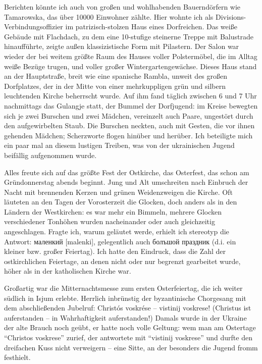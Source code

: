 \documentclass[a5paper,pagesize,10pt,twoside=true]{scrbook}
\newcommand\textcyr[1]{{\fontencoding{OT2}\fontfamily{wncyr}\selectfont #1}}	%
\renewcommand{\marginpar}[2][]{}
\begin{document}
Berichten könnte ich auch von großen und wohlhabenden Bauerndörfern wie Tamarowska, das über \num{10000} Einwohner zählte. Hier wohnte ich als Divisions-Verbindungsoffizier im patrizisch-stolzen Haus eines Dorfreichen. Das weiße Gebäude mit Flachdach, zu dem eine 10-stufige steinerne Treppe mit Balustrade hinaufführte, zeigte außen klassizistische Form mit Pilastern. Der Salon war wieder der bei weitem größte Raum des Hauses voller Polstermöbel, die im Alltag weiße Bezüge trugen, und voller großer Wintergartengewächse. Dieses Haus stand an der Hauptstraße, breit wie eine spanische Rambla, unweit des großen Dorfplatzes, der in der Mitte von einer mehrkuppligen grün und silbern leuchtenden Kirche beherrscht wurde. Auf ihm fand täglich zwischen 6 und 7 Uhr nachmittags das Gulangje statt, der Bummel der Dorfjugend: im Kreise bewegten sich je zwei Burschen und zwei Mädchen, vereinzelt auch Paare, ungestört durch den aufgewirbelten Staub. Die Burschen neckten, auch mit Gesten, die vor ihnen gehenden Mädchen; Scherzworte flogen hinüber und herüber. Ich beteiligte mich ein paar mal an diesem lustigen Treiben, was von der ukrainischen Jugend beifällig aufgenommen wurde.

\marginpar{361}
Alles freute sich auf das größte Fest der Ostkirche, das Osterfest, das schon am Gründonnerstag abends beginnt. Jung und Alt umschreiten nach Einbruch der Nacht mit brennenden Kerzen und grünen Weidenzweigen die Kirche. Oft läuteten an den Tagen der Vorosterzeit die Glocken, doch anders als in den Ländern der Westkirchen: es war mehr ein Bimmeln, mehrere Glocken verschiedener Tonhöhen wurden nacheinander oder auch gleichzeitig angeschlagen. Fragte ich, warum geläutet werde, erhielt ich stereotyp die Antwort: \textcyr{маленкий} [malenki], gelegentlich auch \textcyr{болъшой праздник} (d.i. ein kleiner bzw. großer Feiertag). Ich hatte den Eindruck, dass die Zahl der ostkirchlichen Feiertage, an denen nicht oder nur begrenzt gearbeitet wurde, höher als in der katholischen Kirche war.

Großartig war die Mitternachtsmesse zum ersten Osterfeiertag, die ich weiter südlich in Isjum erlebte. Herrlich inbrünstig der byzantinische Chorgesang mit dem abschließenden Jubelruf: Christós voskrése -- vistinij voskrese! (Christus ist auferstanden -- in Wahrhaftigkeit auferstanden!) Damals wurde in der Ukraine der alte Brauch noch geübt, er hatte noch volle Geltung: wem man am Ostertage \enquote{Christos voskrese} zurief, der antwortete mit \enquote{vistinij voskrese} und durfte den dreifachen Kuss nicht verweigern -- eine Sitte, an der besonders die Jugend fromm festhielt.
\end{document}
